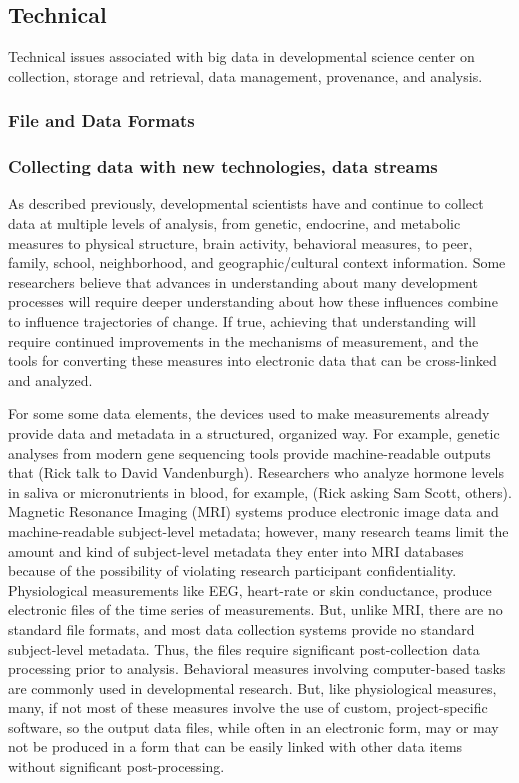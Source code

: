 \documentclass[letterpaper,man,apacite]{apa6}
\begin{document}
\subsection{Technical}

Technical issues associated with big data in developmental science center on collection, storage and retrieval, data management, provenance, and analysis. 

\subsubsection{File and Data Formats}

\subsubsection{Collecting data with new technologies, data streams}

As described previously, developmental scientists have and continue to collect data at multiple levels of analysis, from genetic, endocrine, and metabolic measures to physical structure, brain activity, behavioral measures, to peer, family, school, neighborhood, and geographic/cultural context information.
Some researchers believe that advances in understanding about many development processes will require deeper understanding about how these influences combine to influence trajectories of change.
If true, achieving that understanding will require continued improvements in the mechanisms of measurement, and the tools for converting these measures into electronic data that can be cross-linked and analyzed.

For some some data elements, the devices used to make measurements already provide data and metadata in a structured, organized way.
For example, genetic analyses from modern gene sequencing tools provide machine-readable outputs that (Rick talk to David Vandenburgh).
Researchers who analyze hormone levels in saliva or micronutrients in blood, for example, (Rick asking Sam Scott, others).
Magnetic Resonance Imaging (MRI) systems produce electronic image data and machine-readable subject-level metadata; however, many research teams limit the amount and kind of subject-level metadata they enter into MRI databases because of the possibility of violating research participant confidentiality.
Physiological measurements like EEG, heart-rate or skin conductance, produce electronic files of the time series of measurements.
But, unlike MRI, there are no standard file formats, and most data collection systems provide no standard subject-level metadata.
Thus, the files require significant post-collection data processing prior to analysis. 
Behavioral measures involving computer-based tasks are commonly used in developmental research.
But, like physiological measures, many, if not most of these measures involve the use of custom, project-specific software, so the output data files, while often in an electronic form, may or may not be produced in a form that can be easily linked with other data items without significant post-processing.
\end{document}
